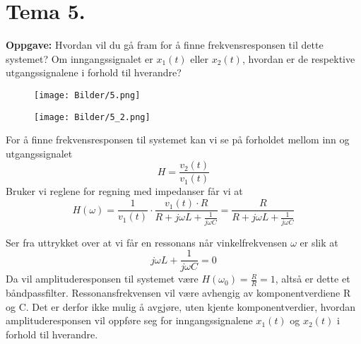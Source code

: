 \documentclass[a4paper,11pt,norsk]{article}
\begin{document}
\section{Tema 5.}
\begin{question}
    \textbf{Oppgave:}
        Hvordan vil du gå fram for å finne frekvensresponsen til dette systemet?
        Om inngangssignalet er $x_1(t)$ eller $x_2(t)$, hvordan er de respektive
        utgangssignalene i forhold til hverandre?
                
        \begin{figure}[H]
            \centering 
            \begin{minipage}{0.3\textwidth}
                \texttt{[image: Bilder/5.png]}
            \end{minipage}
            \begin{minipage}{0.3\textwidth}
                \texttt{[image: Bilder/5\_2.png]}
            \end{minipage}
        \end{figure}
\end{question}
For å finne frekvensresponsen til systemet kan vi se på forholdet mellom inn 
og utgangssignalet
\[
    H = \frac{v_2(t)}{v_1(t)}
\]
Bruker vi reglene for regning med impedanser får vi at
\[
    H(\omega) = \frac{1}{v_1(t)} \cdot \frac{v_1(t) \cdot R}{R + j\omega L + \frac{1}{j\omega C}} = \frac{R}{R + j\omega L + \frac{1}{j\omega C}}
\]

Ser fra uttrykket over at vi får en ressonans når vinkelfrekvensen $\omega$ er slik at 
\[
    j\omega L + \frac{1}{j\omega C} = 0
\]
Da vil amplituderesponsen til systemet være $H(\omega_0) = \frac{R}{R} = 1$, altså er dette 
et båndpassfilter. Ressonansfrekvensen vil være avhengig av komponentverdiene R og C. Det er derfor 
ikke mulig å avgjøre, uten kjente komponentverdier, hvordan amplituderesponsen vil oppføre seg for 
inngangssignalene $x_1(t)$ og $x_2(t)$ i forhold til hverandre. 

\newpage
\end{document}
